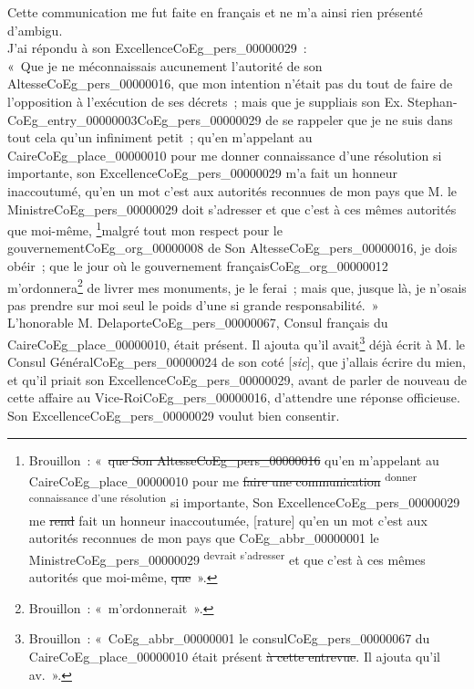 \documentclass{book}
\begin{document}
\indent Cette communication me fut faite en français et ne m’a ainsi rien présenté d’ambigu.\\
\indent J’ai répondu à son Excellence\gls{CoEg_pers_00000029}~:\\
\indent «~Que je ne méconnaissais aucunement l’autorité de son Altesse\gls{CoEg_pers_00000016}, que mon intention n’était pas du tout de faire de l’opposition à l’exécution de ses décrets~; mais que je suppliais son Ex. Stephan-\gls{CoEg_entry_00000003}\gls{CoEg_pers_00000029} de se rappeler que je ne suis dans tout cela qu’un infiniment petit~; qu’en m’appelant au Caire\gls{CoEg_place_00000010} pour me donner connaissance d’une résolution si importante, son Excellence\gls{CoEg_pers_00000029} m’a fait un honneur inaccoutumé, qu’en un mot c’est aux autorités reconnues de mon pays que M. le Ministre\gls{CoEg_pers_00000029} doit s’adresser et que c’est à ces mêmes autorités que moi-même, \footnote{Brouillon~: «~\sout{que Son Altesse\gls{CoEg_pers_00000016}} qu’en m’appelant au Caire\gls{CoEg_place_00000010} pour me \sout{faire une communication} \textsuperscript{donner connaissance d’une résolution} si importante, Son Excellence\gls{CoEg_pers_00000029} me \sout{rend} fait un honneur  inaccoutumée, [rature] qu’en un mot c’est aux autorités reconnues de mon pays que \gls{CoEg_abbr_00000001} le Ministre\gls{CoEg_pers_00000029} \textsuperscript{devrait s’adresser} et que c’est à ces mêmes autorités que moi-même, \sout{que}~».}malgré tout mon respect pour le gouvernement\gls{CoEg_org_00000008} de Son Altesse\gls{CoEg_pers_00000016}, je dois obéir~; que le jour où le gouvernement français\gls{CoEg_org_00000012} m’ordonnera\footnote{Brouillon~: «~m’ordonnerait~».} de livrer mes monuments, je le ferai~; mais que, jusque là, je n’osais pas prendre sur moi seul le poids d’une si grande responsabilité.~»\\
\indent L’honorable M. Delaporte\gls{CoEg_pers_00000067}, Consul français du Caire\gls{CoEg_place_00000010}, était présent. Il ajouta qu’il avait\footnote{Brouillon~: «~\gls{CoEg_abbr_00000001} le consul\gls{CoEg_pers_00000067} du Caire\gls{CoEg_place_00000010} était présent \sout{à cette entrevue}. Il ajouta qu’il av.~».} déjà écrit à M. le Consul Général\gls{CoEg_pers_00000024} de son coté [\textit{sic}], que j’allais écrire du mien, et qu’il priait son Excellence\gls{CoEg_pers_00000029}, avant de parler de nouveau de cette affaire au Vice-Roi\gls{CoEg_pers_00000016}, d’attendre une réponse officieuse.\\
\indent Son Excellence\gls{CoEg_pers_00000029} voulut bien consentir.\\
\end{document}
